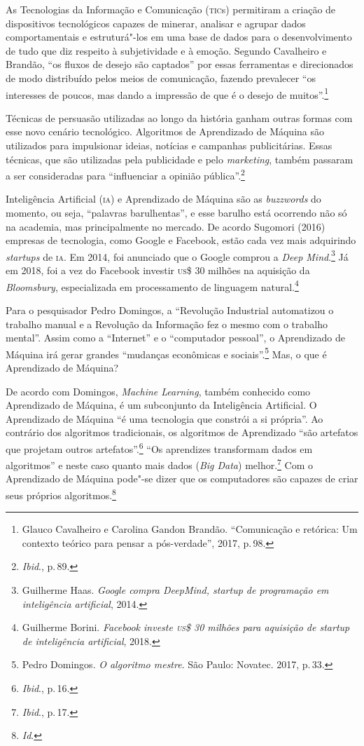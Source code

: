 \noindent{}As Tecnologias da Informação e Comunicação (\textsc{tic}s) permitiram a criação
de dispositivos tecnológicos capazes de minerar, analisar e agrupar
dados comportamentais e estruturá"-los em uma base de dados para o
desenvolvimento de tudo que diz respeito à subjetividade e à emoção.
Segundo Cavalheiro e Brandão, ``os fluxos de desejo são captados''
por essas ferramentas e direcionados de modo distribuído pelos meios de
comunicação, fazendo prevalecer ``os interesses de poucos, mas dando a
impressão de que é o desejo de muitos''.\footnote{Glauco Cavalheiro e Carolina Gandon Brandão. ``Comunicação e
retórica: Um contexto teórico para pensar a pós-verdade'', 2017, p.\,98.}

Técnicas de persuasão utilizadas ao longo da história ganham outras
formas com esse novo cenário tecnológico. Algoritmos de Aprendizado de
Máquina são utilizados para impulsionar ideias, notícias e campanhas
publicitárias. Essas técnicas, que são utilizadas pela publicidade e
pelo \emph{marketing}, também passaram a ser consideradas para ``influenciar a
opinião pública''.\footnote{\textit{Ibid}., p.\,89.}

Inteligência Artificial (\textsc{ia}) e Aprendizado de Máquina são as
\emph{buzzwords} do momento, ou seja, ``palavras barulhentas'', e esse
barulho está ocorrendo não só na academia, mas principalmente no
mercado. De acordo Sugomori (2016) empresas de tecnologia, como Google e
Facebook, estão cada vez mais adquirindo \emph{startups} de \textsc{ia}. Em 2014,
foi anunciado que o Google comprou a \emph{Deep Mind}.\footnote{Guilherme Haas. \emph{Google compra DeepMind, startup de programação
em inteligência artificial}, 2014.} Já
em 2018, foi a vez do Facebook investir \textsc{us}\$ 30 milhões na aquisição da
\emph{Bloomsbury}, especializada em processamento de linguagem natural.\footnote{Guilherme Borini. \emph{Facebook investe \textsc{us}\$ 30 milhões para
aquisição de startup de inteligência artificial}, 2018.}

Para o pesquisador Pedro Domingos, a ``Revolução Industrial
automatizou o trabalho manual e a Revolução da Informação fez o mesmo
com o trabalho mental''. Assim como a ``Internet'' e o ``computador
pessoal'', o Aprendizado de Máquina irá gerar grandes ``mudanças
econômicas e sociais''.\footnote{Pedro Domingos. \emph{O algoritmo mestre}. São Paulo: Novatec. 2017, p.\,33.} Mas, o que é Aprendizado de Máquina?

De acordo com Domingos, \emph{Machine Learning}, também conhecido
como Aprendizado de Máquina, é um subconjunto da Inteligência
Artificial. O Aprendizado de Máquina ``é uma tecnologia que constrói a
si própria''. Ao contrário dos algoritmos tradicionais, os algoritmos de
Aprendizado ``são artefatos que projetam outros artefatos''.\footnote{\textit{Ibid}., p.\,16.}
``Os aprendizes transformam dados em algoritmos'' e neste caso quanto
mais dados (\emph{Big Data}) melhor.\footnote{\textit{Ibid}., p.\,17.} Com o Aprendizado de
Máquina pode"-se dizer que os computadores são capazes de criar seus
próprios algoritmos.\footnote{\textit{Id}.}

